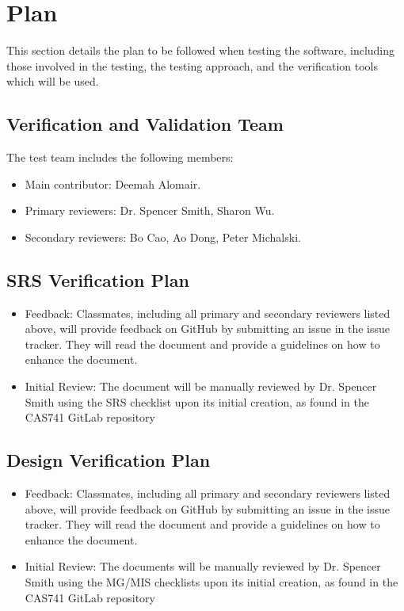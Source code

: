 \documentclass[12pt, titlepage]{article}
\begin{document}
\section{Plan}

This section details the plan to be followed when testing the software, including
those involved in the testing, the testing approach, and the verification tools which will be used.
	
\subsection{Verification and Validation Team}

The test team includes the following members:
\begin{itemize}
\item Main contributor: Deemah Alomair.
\item Primary reviewers: Dr. Spencer Smith, Sharon Wu.
\item Secondary reviewers: Bo Cao, Ao Dong, Peter Michalski.
\end{itemize}

\subsection{SRS Verification Plan}

\begin{itemize}
\item  Feedback: Classmates, including all primary and secondary reviewers
listed above, will provide feedback on GitHub by submitting an issue in the
issue tracker. They will read the document and provide a guidelines on how to enhance the document.
\item Initial Review: The document will be manually reviewed by Dr. Spencer Smith
using the SRS checklist upon its initial creation, as found in the CAS741
GitLab repository 
\end{itemize}

\subsection{Design Verification Plan}

\begin{itemize}
\item  Feedback: Classmates, including all primary and secondary reviewers
listed above, will provide feedback on GitHub by submitting an issue in the
issue tracker. They will read the document and provide a guidelines on how to enhance the document.
\item Initial Review: The documents will be manually reviewed by Dr. Spencer Smith
using the MG/MIS checklists upon its initial creation, as found in the CAS741
GitLab repository 
\end{itemize}
\end{document}
